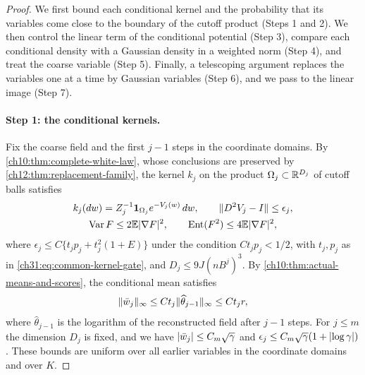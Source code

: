 \begin{proof}
We first bound each conditional kernel and the probability that its variables come close to the boundary of the cutoff product (Steps 1 and 2). We then control the linear term of the conditional potential (Step 3), compare each conditional density with a Gaussian density in a weighted norm (Step 4), and treat the coarse variable (Step 5). Finally, a telescoping argument replaces the variables one at a time by Gaussian variables (Step 6), and we pass to the linear image (Step 7).

\paragraph{Step 1: the conditional kernels.}
Fix the coarse field and the first $j-1$ steps in the coordinate domains. By \cref{ch10:thm:complete-white-law}, whose conclusions are preserved by \cref{ch12:thm:replacement-family}, the kernel $k_j$ on the product $\Omega_j\subset\mathbb R^{D_j}$ of cutoff balls satisfies
\[
 \begin{gathered}
 k_j(dw)=Z_j^{-1}\mathbf 1_{\Omega_j}e^{-V_j(w)}\,dw,\qquad\lVert D^2V_j-I\rVert\le\epsilon_j,\\
 \operatorname{Var} F\le2\mathbb E\lvert \nabla F\rvert^2,\qquad\operatorname{Ent}(F^2)\le4\mathbb E\lvert \nabla F\rvert^2,
 \end{gathered}
\]
where $\epsilon_j\le C\{t_jp_j+t_j^2(1+E)\}$ under the condition $Ct_jp_j<1/2$, with $t_j,p_j$ as in \eqref{ch31:eq:common-kernel-gate}, and $D_j\le9J(nB^j)^3$. By \cref{ch10:thm:actual-means-and-scores}, the conditional mean satisfies
\begin{equation}\label{ch31:eq:actual-white-mean}
 \lVert \bar w_j\rVert_\infty\le Ct_j\lVert \widehat\theta_{j-1}\rVert_\infty\le Ct_jr,
\end{equation}
where $\widehat\theta_{j-1}$ is the logarithm of the reconstructed field after $j-1$ steps. For $j\le m$ the dimension $D_j$ is fixed, and we have $\lvert \bar w_j\rvert\le C_m\sqrt\gamma$ and $\epsilon_j\le C_m\sqrt\gamma(1+\lvert \log\gamma\rvert)$. These bounds are uniform over all earlier variables in the coordinate domains and over $K$.


\end{proof}
